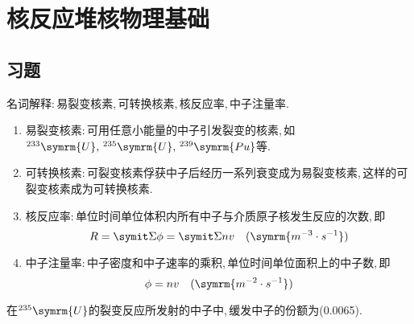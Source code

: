 \chapter{核反应堆核物理基础}

\section*{习题}

\begin{exercise}
    名词解释:\,易裂变核素,\,可转换核素,\,核反应率,\,中子注量率. 
    \begin{solution}
        \begin{enumerate}[(1)]
            \item 易裂变核素:\,可用任意小能量的中子引发裂变的核素,\,如${}^{233}\symrm{U},\,{}^{235}\symrm{U},\,{}^{239}\symrm{Pu}$等. 
            \item 可转换核素:\,可裂变核素俘获中子后经历一系列衰变成为易裂变核素,\,这样的可裂变核素成为可转换核素. 
            \item 核反应率:\,单位时间单位体积内所有中子与介质原子核发生反应的次数,\,即
            \begin{equation*}
                R = \vSigma \phi = \vSigma n v \quad (\symrm{m^{-3}\cdot s^{-1}})
            \end{equation*}
            \item 中子注量率:\,中子密度和中子速率的乘积,\,单位时间单位面积上的中子数,\,即
            \begin{equation*}
                \phi = n v \quad (\symrm{m^{-2}\cdot s^{-1}})
            \end{equation*}
        \end{enumerate}
    \end{solution}
\end{exercise}

\begin{exercise}
    在${}^{235}\symrm{U}$的裂变反应所发射的中子中,\,缓发中子的份额为(0.0065).
\end{exercise}

